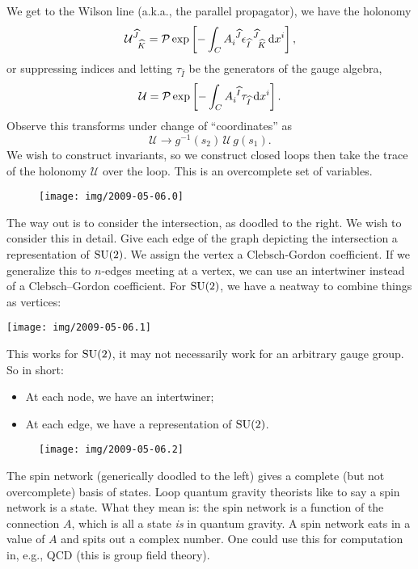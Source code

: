 We get to the Wilson line (a.k.a., the parallel propagator), we have the
holonomy
\begin{equation}
\mathcal{U}^{\widehat{J}}_{\phantom{J}\widehat{K}}
  = \mathcal{P}\exp\left[-\int_{C}A_{i}^{\phantom{i}\widehat{J}}{{\epsilon_{\widehat{I}}}^{\,\widehat{J}}}_{\!\widehat{K}}\, \mathrm{d} x^{i}\right],
\end{equation}
or suppressing indices and letting $\tau_{\widehat{I}}$ be the
generators of the gauge algebra,
\begin{equation}
\mathcal{U}
= \mathcal{P}\exp\left[-\int_{C}A_{i}^{\phantom{i}\widehat{I}}\tau_{\widehat{I}}\, \mathrm{d} x^{i}\right].
\end{equation}
Observe this transforms under change of ``coordinates'' as
\begin{equation}
\mathcal{U}\to g^{-1}(s_{2})\,\mathcal{U}\, g(s_{1}).
\end{equation}
We wish to construct invariants, so we construct closed loops then take
the trace of the holonomy $\mathcal{U}$ over the loop. This is an
overcomplete set of variables.

\begin{wrapfigure}{R}{7pc}
\centering\vskip-1pc
\texttt{[image: img/2009-05-06.0]}
\end{wrapfigure}
The way out is to consider the intersection, as doodled to the right.
We wish to consider this in detail. Give each edge of the graph
depicting the intersection a representation of $\operatorname{SU}(2)$.
We assign the vertex a Clebsch-Gordon coefficient. If we generalize this
to $n$-edges meeting at a vertex, we can use an intertwiner instead of a
Clebsch--Gordon coefficient. For $\operatorname{SU}(2)$, we have a neatway to combine
things as vertices:
\begin{center}
  \texttt{[image: img/2009-05-06.1]}
\end{center}
This works for $\operatorname{SU}(2)$, it may not necessarily work for an arbitrary
gauge group. So in short:
\begin{itemize}
\item At each node, we have an intertwiner;
\item At each edge, we have a representation of $\operatorname{SU}(2)$.
\end{itemize}

\begin{wrapfigure}{l}{8pc}
\centering %
\texttt{[image: img/2009-05-06.2]}
\end{wrapfigure}
The spin network (generically doodled to the left) gives a complete (but
not overcomplete) basis of states. Loop quantum gravity theorists like
to say a spin network is a state. What they mean is: the spin network is
a function of the connection $A$, which is all a state \emph{is} in
quantum gravity. A spin network eats in a value of $A$ and spits out a
complex number. One could use this for computation in, e.g., QCD (this
is group field theory).

